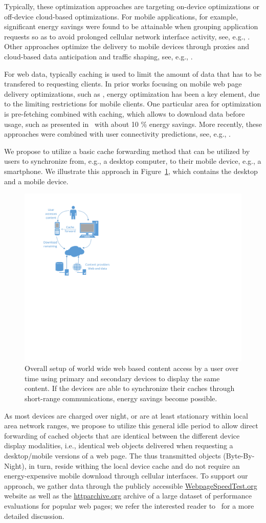 \documentclass[letterpaper,journal,onecolumn,draftcls]{IEEEtran}
\begin{document}
Typically, these optimization approaches are targeting on-device optimizations or off-device cloud-based optimizations.
For mobile applications, for example, significant energy savings were found to be attainable when grouping application requests so as to avoid prolonged cellular network interface activity, see, e.g., \cite{BaBaVe09,QiWaGaHuGe12}.
Other approaches optimize the delivery to mobile devices through proxies and cloud-based data anticipation and traffic shaping, see, e.g., \cite{XiHuSaYl11}.

For web data, typically caching is used to limit the amount of data that has to be transfered to requesting clients.
In prior works focusing on mobile web page delivery optimizations, such as \cite{SaIs02}, energy optimization has been a key element, due to the limiting restrictions for mobile clients.
One particular area for optimization is pre-fetching combined with caching, which allows to download data before usage, such as presented in~\cite{ShKuDaWa05} with about 10 \% energy savings.
More recently, these approaches were combined with user connectivity predictions, see, e.g., \cite{ThChWo13}.

We propose to utilize a basic cache forwarding method that can be utilized by users to synchronize from, e.g., a desktop computer, to their mobile device, e.g., a smartphone.
We illustrate this approach in Figure~\ref{fig:setup}, which contains the desktop and a mobile device. 
\begin{figure}
	\centering
	\includegraphics[width=.5\linewidth]{Drawing1}
	\caption{Overall setup of world wide web based content access by a user over time using primary and secondary devices to display the same content. If the devices are able to synchronize their caches through short-range communications, energy savings become possible.}
	\label{fig:setup}
\end{figure}
As most devices are charged over night, or are at least stationary within local area network ranges, we propose to utilize this general idle period to allow direct forwarding of cached objects that are identical between the different device display modalities, i.e., identical web objects delivered when requesting a desktop/mobile versions of a web page.
The thus transmitted objects (Byte-By-Night), in turn, reside withing the local device cache and do not require an energy-expensive mobile download through cellular interfaces.
To support our approach, we gather data through the publicly accessible \url{WebpageSpeedTest.org} website as well as the \url{httparchive.org} archive of a large dataset of performance evaluations for popular web pages; we refer the interested reader to~\cite{Me13} for a more detailed discussion.
\end{document}
